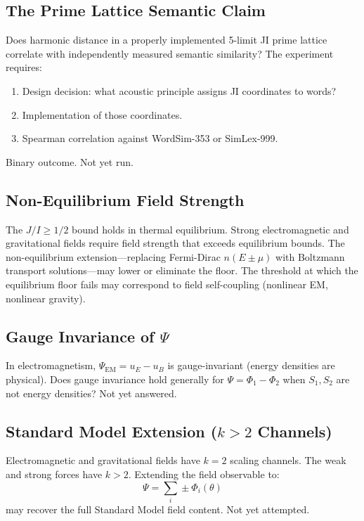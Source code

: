 \documentclass[11pt]{article}
\begin{document}
\subsection{The Prime Lattice Semantic Claim}

Does harmonic distance in a properly implemented 5-limit JI prime lattice correlate with independently measured semantic similarity? The experiment requires:
\begin{enumerate}
  \item Design decision: what acoustic principle assigns JI coordinates to words?
  \item Implementation of those coordinates.
  \item Spearman correlation against WordSim-353 or SimLex-999.
\end{enumerate}
Binary outcome. Not yet run.

\subsection{Non-Equilibrium Field Strength}

The $J/I \geq 1/2$ bound holds in thermal equilibrium. Strong electromagnetic and gravitational fields require field strength that exceeds equilibrium bounds. The non-equilibrium extension---replacing Fermi-Dirac $n(E \pm \mu)$ with Boltzmann transport solutions---may lower or eliminate the floor. The threshold at which the equilibrium floor fails may correspond to field self-coupling (nonlinear EM, nonlinear gravity).

\subsection{Gauge Invariance of $\Psi$}

In electromagnetism, $\Psi_{\text{EM}} = u_E - u_B$ is gauge-invariant (energy densities are physical). Does gauge invariance hold generally for $\Psi = \Phi_1 - \Phi_2$ when $S_1, S_2$ are not energy densities? Not yet answered.

\subsection{Standard Model Extension ($k > 2$ Channels)}

Electromagnetic and gravitational fields have $k = 2$ scaling channels. The weak and strong forces have $k > 2$. Extending the field observable to:
\begin{equation}
  \Psi = \sum_i \pm \Phi_i(\theta)
\end{equation}
may recover the full Standard Model field content. Not yet attempted.
\end{document}
